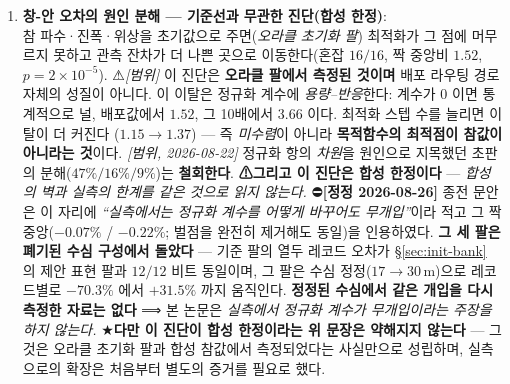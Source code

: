 \documentclass[11pt]{report}
\numberwithin{equation}{chapter}
\numberwithin{figure}{chapter}
\numberwithin{table}{chapter}
\begin{document}
\begin{enumerate}
  \item \textbf{창-안 오차의 원인 분해 --- 기준선과 무관한 진단(합성 한정)}: \\
        참 파수·진폭·위상을 초기값으로 주면(\emph{오라클 초기화 팔}) 최적화가 그 점에
        머무르지 못하고 관측 잔차가 더 나쁜 곳으로 이동한다(혼잡 $16/16$, 짝 중앙비
        $1.52$, $p = 2\times10^{-5}$). ⚠\emph{[범위]} 이 진단은 \textbf{오라클 팔에서
        측정된 것이며} 배포 라우팅 경로 자체의 성질이 아니다. 이 이탈은 정규화 계수에
        \emph{용량--반응}한다: 계수가 $0$ 이면 통계적으로 널, 배포값에서 $1.52$,
        그 10배에서 $3.66$ 이다. 최적화 스텝 수를 늘리면 이탈이 더 커진다
        ($1.15 \to 1.37$) --- 즉 \emph{미수렴}이 아니라 \textbf{목적함수의 최적점이
        참값이 아니라는 것}이다.
        \emph{[범위, 2026-08-22]} 정규화 항의 \emph{차원}을 원인으로 지목했던 초판의
        분해($47\%/16\%/9\%$)는 \textbf{철회한다}.
        \textbf{⚠그리고 이 진단은 합성 한정이다} --- \emph{합성의 벽과 실측의 한계를
        같은 것으로 읽지 않는다.}
        ⛔\textbf{[정정 2026-08-26]} 종전 문안은 이 자리에 \emph{``실측에서는 정규화 계수를
        어떻게 바꾸어도 무개입''}이라 적고 그 짝 중앙($-0.07\%$ / $-0.22\%$; 벌점을 완전히
        제거해도 동일)을 인용하였다. \textbf{그 세 팔은 폐기된 수심 구성에서 돌았다} ---
        기준 팔의 열두 레코드 오차가 \S\ref{sec:init-bank} 의 제안 표현 팔과 $12/12$ 비트
        동일이며, 그 팔은 수심 정정($17 \to 30$\,m)으로 레코드별로 $-70.3\%$ 에서
        $+31.5\%$ 까지 움직인다. \textbf{정정된 수심에서 같은 개입을 다시 측정한 자료는
        없다} ⟹ 본 논문은 \emph{실측에서 정규화 계수가 무개입이라는 주장을 하지 않는다.}
        ★\textbf{다만 이 진단이 합성 한정이라는 위 문장은 약해지지 않는다} --- 그것은
        오라클 초기화 팔과 합성 참값에서 측정되었다는 사실만으로 성립하며, 실측으로의
        확장은 처음부터 별도의 증거를 필요로 했다.


\end{enumerate}
\end{document}
